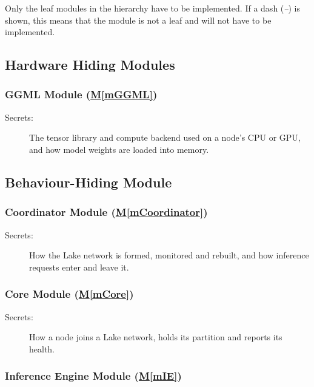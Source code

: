 \documentclass[12pt, titlepage]{article}
\newcommand{\mref}[1]{\hyperref[sec:#1]{M\ref*{#1}}}
\begin{document}
Only the leaf modules in the hierarchy have to be implemented. If a dash
(\emph{--}) is shown, this means that the module is not a leaf and will not have
to be implemented.

\subsection{Hardware Hiding Modules}

\subsubsection{GGML Module (\mref{mGGML})} \label{sec:mGGML}

\begin{description}
\item[Secrets:] The tensor library and compute backend used on a node's CPU or
  GPU, and how model weights are loaded into memory.
\end{description}

\subsection{Behaviour-Hiding Module}

\subsubsection{Coordinator Module (\mref{mCoordinator})} \label{sec:mCoordinator}

\begin{description}
\item[Secrets:] How the Lake network is formed, monitored and rebuilt, and how
  inference requests enter and leave it.
\end{description}

\subsubsection{Core Module (\mref{mCore})} \label{sec:mCore}

\begin{description}
\item[Secrets:] How a node joins a Lake network, holds its partition and
  reports its health.
\end{description}

\subsubsection{Inference Engine Module (\mref{mIE})} \label{sec:mIE}
\end{document}
